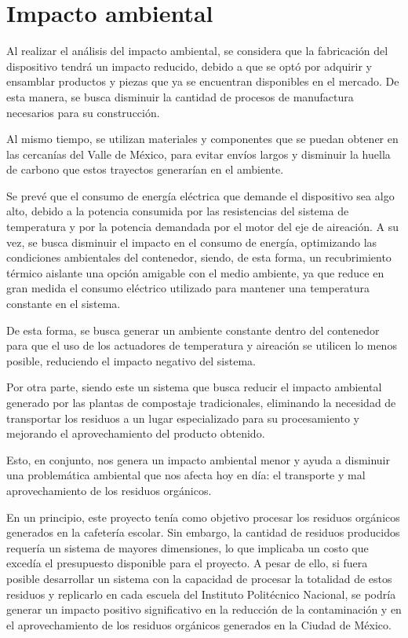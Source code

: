 \clearpage
\section{Impacto ambiental}

Al realizar el análisis del impacto ambiental, se considera que la fabricación del dispositivo tendrá un impacto reducido, debido a que se optó por adquirir y ensamblar productos y piezas que ya se encuentran disponibles en el mercado. De esta manera, se busca disminuir la cantidad de procesos de manufactura necesarios para su construcción.

Al mismo tiempo, se utilizan materiales y componentes que se puedan obtener en las cercanías del Valle de México, para evitar envíos largos y disminuir la huella de carbono que estos trayectos generarían en el ambiente.

Se prevé que el consumo de energía eléctrica que demande el dispositivo sea algo alto, debido a la potencia consumida por las resistencias del sistema de temperatura y por la potencia demandada por el motor del eje de aireación. A su vez, se busca disminuir el impacto en el consumo de energía, optimizando las condiciones ambientales del contenedor, siendo, de esta forma, un recubrimiento térmico aislante una opción amigable con el medio ambiente, ya que reduce en gran medida el consumo eléctrico utilizado para mantener una temperatura constante en el sistema.

De esta forma, se busca generar un ambiente constante dentro del contenedor para que el uso de los actuadores de temperatura y aireación se utilicen lo menos posible, reduciendo el impacto negativo del sistema.

Por otra parte, siendo este un sistema que busca reducir el impacto ambiental generado por las plantas de compostaje tradicionales, eliminando la necesidad de transportar los residuos a un lugar especializado para su procesamiento y mejorando el aprovechamiento del producto obtenido.

Esto, en conjunto, nos genera un impacto ambiental menor y ayuda a disminuir una problemática ambiental que nos afecta hoy en día: el transporte y mal aprovechamiento de los residuos orgánicos.

En un principio, este proyecto tenía como objetivo procesar los residuos orgánicos generados en la cafetería escolar. Sin embargo, la cantidad de residuos producidos requería un sistema de mayores dimensiones, lo que implicaba un costo que excedía el presupuesto disponible para el proyecto. A pesar de ello, si fuera posible desarrollar un sistema con la capacidad de procesar la totalidad de estos residuos y replicarlo en cada escuela del Instituto Politécnico Nacional, se podría generar un impacto positivo significativo en la reducción de la contaminación y en el aprovechamiento de los residuos orgánicos generados en la Ciudad de México.